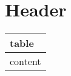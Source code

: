 \section{Header}
\begin{longtable}[]{@{}l@{}}
\hline
table\tabularnewline
\hline
\endfirsthead
content\tabularnewline
\hline
\end{longtable}
